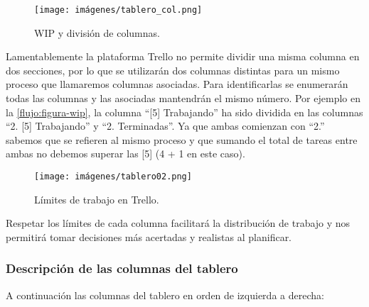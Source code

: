 \begin{figure}[H]
	\centering
	\caption{WIP y división de columnas.}
	\label{flujo:figura-col}
	\texttt{[image: imágenes/tablero\_col.png]}
\end{figure}

Lamentablemente la plataforma Trello no permite dividir una misma columna en dos secciones, por lo que se utilizarán dos columnas distintas para un mismo proceso que llamaremos columnas asociadas. Para identificarlas se enumerarán todas las columnas y las asociadas mantendrán el mismo número. Por ejemplo en la \autoref{flujo:figura-wip}, la columna “[5] Trabajando” ha sido dividida en las columnas “2. [5] Trabajando” y “2. Terminadas”. Ya que ambas comienzan con “2.” sabemos que se refieren al mismo proceso y que sumando el total de tareas entre ambas no debemos superar las [5] (4 + 1 en este caso).

\begin{figure}[h]
	\centering
	\caption{Límites de trabajo en Trello.}
	\label{flujo:figura-wip}
	\texttt{[image: imágenes/tablero02.png]}
\end{figure}

Respetar los límites de cada columna facilitará la distribución de trabajo y nos permitirá tomar decisiones más acertadas y realistas al planificar.

\subsubsection{Descripción de las columnas del tablero}\label{flujo:descripcion-de-columnas}
A continuación las columnas del tablero en orden de izquierda a derecha:

